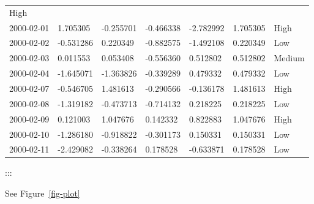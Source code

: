 \documentclass[
  letterpaper,
  DIV=11,
  numbers=noendperiod]{scrreport}
\begin{document}
\begin{longtable}[]{@{}lllllll@{}}
High \\
2000-02-01 & 1.705305 & -0.255701 & -0.466338 & -2.782992 & 1.705305 &
High \\
2000-02-02 & -0.531286 & 0.220349 & -0.882575 & -1.492108 & 0.220349 &
Low \\
2000-02-03 & 0.011553 & 0.053408 & -0.556360 & 0.512802 & 0.512802 &
Medium \\
2000-02-04 & -1.645071 & -1.363826 & -0.339289 & 0.479332 & 0.479332 &
Low \\
2000-02-07 & -0.546705 & 1.481613 & -0.290566 & -0.136178 & 1.481613 &
High \\
2000-02-08 & -1.319182 & -0.473713 & -0.714132 & 0.218225 & 0.218225 &
Low \\
2000-02-09 & 0.121003 & 1.047676 & 0.142332 & 0.822883 & 1.047676 &
High \\
2000-02-10 & -1.286180 & -0.918822 & -0.301173 & 0.150331 & 0.150331 &
Low \\
2000-02-11 & -2.429082 & -0.338264 & 0.178528 & -0.633871 & 0.178528 &
Low \\
\bottomrule()
\end{longtable}

:::

See Figure~\ref{fig-plot}
\end{document}
